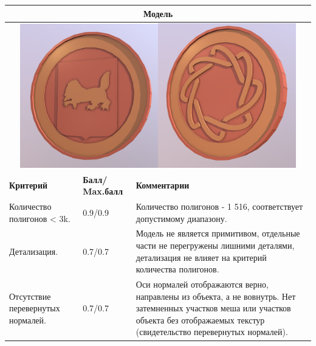 \begin{longtable}{|p{4cm}|p{2.5cm}|p{7.5cm}|}
    \hline
    \multicolumn{3}{|c|}{\textbf{Модель}} \\
    \hline
    \multicolumn{3}{|c|}{\includegraphics[width=6cm]{src/model_a1}\includegraphics[width=6cm]{src/model_a2}} \\
    \hline
    \textbf{Критерий} & \textbf{Балл/ Max.балл} & \textbf{Комментарии} \\
    \hline
    Количество полигонов < 3k. & 0.9/0.9 & Количество полигонов - 1 516, соответствует допустимому диапазону. \\
    \hline
    Детализация. & 0.7/0.7 & Модель не является примитивом, отдельные части не перегружены лишними деталями, детализация не влияет на критерий количества полигонов. \\
    \hline
    Отсутствие перевернутых нормалей. & 0.7/0.7 & Оси нормалей отображаются верно, направлены из объекта, а не вовнутрь. Нет затемненных участков меша или участков объекта без отображаемых текстур (свидетельство перевернутых нормалей). 
    

\end{longtable}
